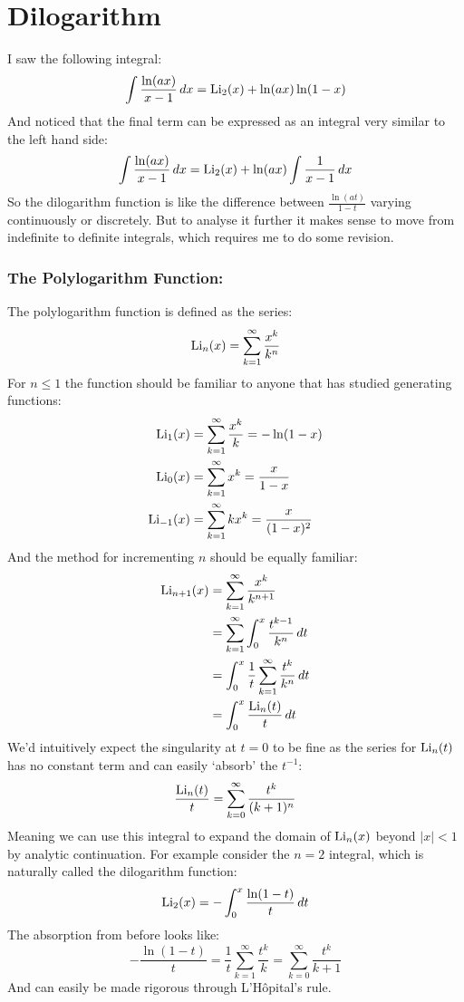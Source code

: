 
\section{Dilogarithm}
I saw the following integral:
\[\int\frac{\ln(ax)}{x-1}\,dx=\operatorname{Li}_2(x)+\ln(ax)\ln(1-x)\]
And noticed that the final term can be expressed as an integral very similar to the left hand side:
\[\int\frac{\ln(ax)}{x-1}\,dx=\operatorname{Li}_2(x)+\ln(ax)\int\frac{1}{x-1}\,dx\]
So the dilogarithm function is like the difference between $\frac{\ln(at)}{1-t}$ varying continuously or discretely.
But to analyse it further it makes sense to move from indefinite to definite integrals,
which requires me to do some revision.

\subsubsection{The Polylogarithm Function:}
The polylogarithm function is defined as the series:
\[\operatorname{Li}_n(x) = \sum_{k=1}^\infty\frac{x^k}{k^n}\]
For $n\leq 1$ the function should be familiar to anyone that has studied generating functions:
\[\begin{aligned}
	\operatorname{Li}_1(x) &= \sum_{k=1}^\infty\frac{x^k}{k} = -\ln(1-x) \\ 
	\operatorname{Li}_0(x) &=\sum_{k=1}^\infty x^k =\frac{x}{1-x} \\
	\operatorname{Li}_{-1}(x) &=\sum_{k=1}^\infty kx^k = \frac{x}{(1-x)^2} \\
\end{aligned}\]
And the method for incrementing $n$ should be equally familiar:
\[\begin{aligned}
	\operatorname{Li}_{n+1}(x) &= \sum_{k=1}^\infty\frac{x^k}{k^{n+1}}\\
	&= \sum_{k=1}^\infty\int_0^x\frac{t^{k-1}}{k^{n}}\,dt\\
	&= \int_0^x\frac{1}{t}\sum_{k=1}^\infty\frac{t^k}{k^{n}}\,dt\\
	&= \int_0^x\frac{\operatorname{Li}_n(t)}{t}\,dt\\
\end{aligned}\]
We'd intuitively expect the singularity at $t=0$ to be fine as the series for $\operatorname{Li}_n(t)$ has no constant term and can easily `absorb' the $t^{-1}$:
\[\frac{\operatorname{Li}_n(t)}{t} = \sum_{k=0}^\infty\frac{t^k}{(k+1)^n}\]
Meaning we can use this integral to expand the domain of $\operatorname{Li}_n(x)$ beyond $|x|<1$ by analytic continuation.
For example consider the $n=2$ integral,
which is naturally called the dilogarithm function:
\[\operatorname{Li}_2(x)=-\int_0^x\frac{\ln(1-t)}{t}\,dt\]
The absorption from before looks like:
\[-\frac{\ln(1-t)}{t} = \frac{1}{t}\sum_{k=1}^\infty\frac{t^k}{k}= \sum_{k=0}^\infty\frac{t^k}{k+1}\]
And can easily be made rigorous through L'Hôpital's rule.

